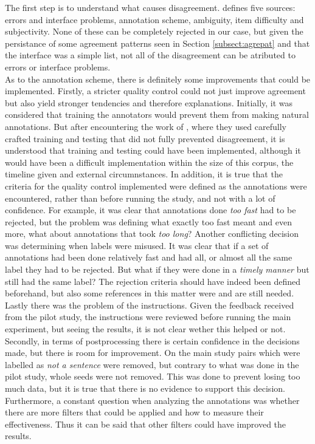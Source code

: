 The first step is to understand what causes disagreement. \citet{uma2021learning} defines five sources: errors and interface problems, annotation scheme, ambiguity, item difficulty and subjectivity. None of these can be completely rejected in our case, but given the persistance of some agreement patterns seen in Section \ref{subsect:agrepat} and that the interface was a simple list, not all of the disagreement can be atributed to errors or interface problems.\\ 

As to the annotation scheme, there is definitely some improvements that could be implemented. Firstly, a stricter quality control could not just improve agreement but also yield stronger tendencies and therefore explanations. Initially, it was considered that training the annotators would prevent them from making natural annotations. But after encountering the work of \citet{nie2020can}, where they used carefully crafted training and testing that did not fully prevented disagreement, it is understood that training and testing could have been implemented, although it would have been a difficult implementation within the size of this corpus, the timeline given and external circumnstances. In addition, it is true that the criteria for the quality control implemented were defined as the annotations were encountered, rather than before running the study, and not with a lot of confidence. For example, it was clear that annotations done \textit{too fast} had to be rejected, but the problem was defining what exactly too fast meant and even more, what about annotations that took \textit{too long}? Another conflicting decision was determining when labels were misused. It was clear that if a set of annotations had been done relatively fast and had all, or almost all the same label they had to be rejected. But what if they were done in a \textit{timely manner} but still had the same label? The rejection criteria should have indeed been defined beforehand, but also some references in this matter were and are still needed. Lastly there was the problem of the instructions. Given the feedback received from the pilot study, the instructions were reviewed before running the main experiment, but seeing the results, it is not clear wether this helped or not.\\

Secondly, in terms of postprocessing there is certain confidence in the decisions made, but there is room for improvement. On the main study pairs which were labelled as \textit{not a sentence} were removed, but contrary to what was done in the pilot study, whole seeds were not removed. This was done to prevent losing too much data, but it is true that there is no evidence to support this decision. Furthermore, a constant question when analyzing the annotations was whether there are more filters that could be applied and how to measure their effectiveness. Thus it can be said that other filters could have improved the results.\\

